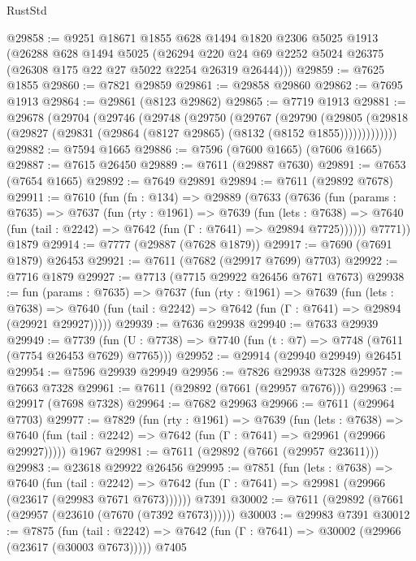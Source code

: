 \begin{lexlean}{RustStd}
\begin{coremodule}
{\begin{coremodule}
{{{{{{{{{{{{{{{{{{{{{{{{{{{{{{{{{{@29858 := @9251
    @18671
    @1855
    @628
    @1494
    @1820
    @2306
    @5025
    @1913
    (@26288
      @628
      @1494
      @5025
      (@26294 @220 @24 @69 @2252 @5024 @26375 (@26308 @175 @22 @27 @5022 @2254 @26319 @26444)))
@29859 := @7625 @1855
@29860 := @7821 @29859
@29861 := @29858 @29860
@29862 := @7695 @1913
@29864 := @29861 (@8123 @29862)
@29865 := @7719 @1913
@29881 := @29678
    (@29704
      (@29746
        (@29748
          (@29750
            (@29767
              (@29790
                (@29805
                  (@29818 (@29827 (@29831 (@29864 (@8127 @29865) (@8132 (@8152 @1855)))))))))))))
@29882 := @7594 @1665
@29886 := @7596 (@7600 @1665) (@7606 @1665)
@29887 := @7615 @26450
@29889 := @7611 (@29887 @7630)
@29891 := @7653 (@7654 @1665)
@29892 := @7649 @29891
@29894 := @7611 (@29892 @7678)
@29911 := @7610
    (fun (fn : @134) =>
    @29889
      (@7633
        (@7636
          (fun (params : @7635) =>
          @7637
            (fun (rty : @1961) =>
            @7639
              (fun (lets : @7638) =>
              @7640 (fun (tail : @2242) => @7642 (fun (Γ : @7641) => @29894 @7725))))))
        @7771))
    @1879
@29914 := @7777 (@29887 (@7628 @1879))
@29917 := @7690 (@7691 @1879) @26453
@29921 := @7611 (@7682 (@29917 @7699) @7703)
@29922 := @7716 @1879
@29927 := @7713 (@7715 @29922 @26456 @7671 @7673)
@29938 := fun (params : @7635) =>
  @7637
    (fun (rty : @1961) =>
    @7639
      (fun (lets : @7638) =>
      @7640 (fun (tail : @2242) => @7642 (fun (Γ : @7641) => @29894 (@29921 @29927)))))
@29939 := @7636 @29938
@29940 := @7633 @29939
@29949 := @7739
    (fun (U : @7738) => @7740 (fun (t : @7) => @7748 (@7611 (@7754 @26453 @7629) @7765)))
@29952 := @29914 (@29940 @29949) @26451
@29954 := @7596 @29939 @29949
@29956 := @7826 @29938 @7328
@29957 := @7663 @7328
@29961 := @7611 (@29892 (@7661 (@29957 @7676)))
@29963 := @29917 (@7698 @7328)
@29964 := @7682 @29963
@29966 := @7611 (@29964 @7703)
@29977 := @7829
    (fun (rty : @1961) =>
    @7639
      (fun (lets : @7638) =>
      @7640 (fun (tail : @2242) => @7642 (fun (Γ : @7641) => @29961 (@29966 @29927)))))
    @1967
@29981 := @7611 (@29892 (@7661 (@29957 @23611)))
@29983 := @23618 @29922 @26456
@29995 := @7851
    (fun (lets : @7638) =>
    @7640
      (fun (tail : @2242) =>
      @7642 (fun (Γ : @7641) => @29981 (@29966 (@23617 (@29983 @7671 @7673))))))
    @7391
@30002 := @7611 (@29892 (@7661 (@29957 (@23610 (@7670 (@7392 @7673))))))
@30003 := @29983 @7391
@30012 := @7875
    (fun (tail : @2242) => @7642 (fun (Γ : @7641) => @30002 (@29966 (@23617 (@30003 @7673)))))
    @7405
}}}}}}}}}}}}}}}}}}}}}}}}}}}}}}}}}}
\end{coremodule}}
\end{coremodule}
\end{lexlean}
